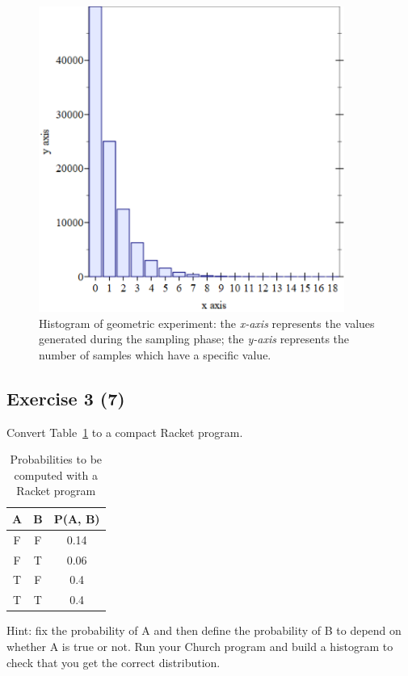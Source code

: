 \begin{figure}[h]
    \centering
    \includegraphics[width=10cm]{images/3.5.png}
    \caption{
        Histogram of geometric experiment: the \textit{x-axis} represents the values generated during the sampling phase; 
        the \textit{y-axis} represents the number of samples which have a specific value.
    }
    \label{fig:3-5}
\end{figure}


\subsection*{Exercise 3 (7)}
Convert Table~\ref{tab:es3-7} to a compact Racket program.
\begin{table}[H]
    \begin{center}
        \begin{tabular}{ccc}
            \hline
            A & B & P(A, B) \\
            \hline
            F & F & 0.14 \\
            F & T & 0.06 \\
            T & F & 0.4 \\
            T & T & 0.4 \\
            \hline
        \end{tabular}
    \end{center}
    \caption{Probabilities to be computed with a Racket program}
    \label{tab:es3-7}
\end{table}

\noindent Hint: fix the probability of A and then define the probability of B to depend on whether A is true or not. 
Run your Church program and build a histogram to check that you get the correct distribution.

